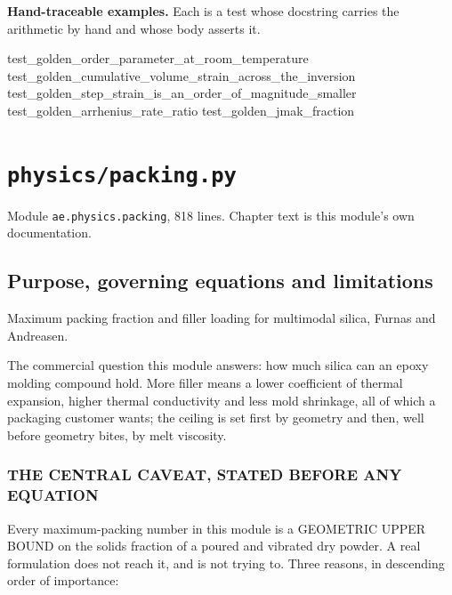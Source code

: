 \documentclass[10pt,a4paper,twoside]{report}
\begin{document}
\normalsize

\textbf{Hand-traceable examples.} Each is a test whose docstring carries the arithmetic by hand and whose body asserts it.

\begin{verbatimsmall}
test_golden_order_parameter_at_room_temperature
test_golden_cumulative_volume_strain_across_the_inversion
test_golden_step_strain_is_an_order_of_magnitude_smaller
test_golden_arrhenius_rate_ratio
test_golden_jmak_fraction
\end{verbatimsmall}

\clearpage

\chapter{\texttt{physics/packing.py}}\label{ch:packing}


{\footnotesize\color{slate}Module \texttt{ae.physics.packing}, 818 lines. Chapter text is this module's own documentation.\par}

\section{Purpose, governing equations and limitations}

Maximum packing fraction and filler loading for multimodal silica, Furnas and Andreasen.

The commercial question this module answers: how much silica can an epoxy molding compound hold. More filler means a lower coefficient of thermal expansion, higher thermal conductivity and less mold shrinkage, all of which a packaging customer wants; the ceiling is set first by geometry and then, well before geometry bites, by melt viscosity.

\subsection*{THE CENTRAL CAVEAT, STATED BEFORE ANY EQUATION}

Every maximum-packing number in this module is a GEOMETRIC UPPER BOUND on the solids fraction of a poured and vibrated dry powder. A real formulation does not reach it, and is not trying to. Three reasons, in descending order of importance:
\end{document}
